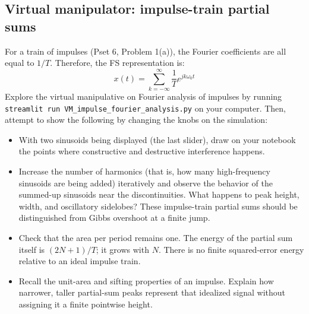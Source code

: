 \subsection{Virtual manipulator: impulse-train partial sums}
For a train of impulses (Pset 6, Problem 1(a)), the Fourier coefficients are all equal to \(1/T\). Therefore, the FS representation is:
\[
x(t) = \sum_{k=-\infty}^{\infty} \frac{1}{T} e^{j k \omega_0 t}
\]
Explore the virtual manipulative on Fourier analysis of impulses by running \texttt{streamlit run VM\_impulse\_fourier\_analysis.py} on your computer. Then, attempt to show the following by changing the knobs on the simulation:
\begin{itemize}
    \item With two sinusoids being displayed (the last slider), draw on your notebook the points where constructive and destructive interference happens.
    \item Increase the number of harmonics (that is, how many high-frequency sinusoids are being added) iteratively and observe the behavior of the summed-up sinusoids near the discontinuities. What happens to peak height, width, and oscillatory sidelobes? These impulse-train partial sums should be distinguished from Gibbs overshoot at a finite jump.
    \item Check that the area per period remains one. The energy of the partial sum itself is $(2N+1)/T$; it grows with $N$. There is no finite squared-error energy relative to an ideal impulse train.
    \item Recall the unit-area and sifting properties of an impulse. Explain how narrower, taller partial-sum peaks represent that idealized signal without assigning it a finite pointwise height.
\end{itemize}

